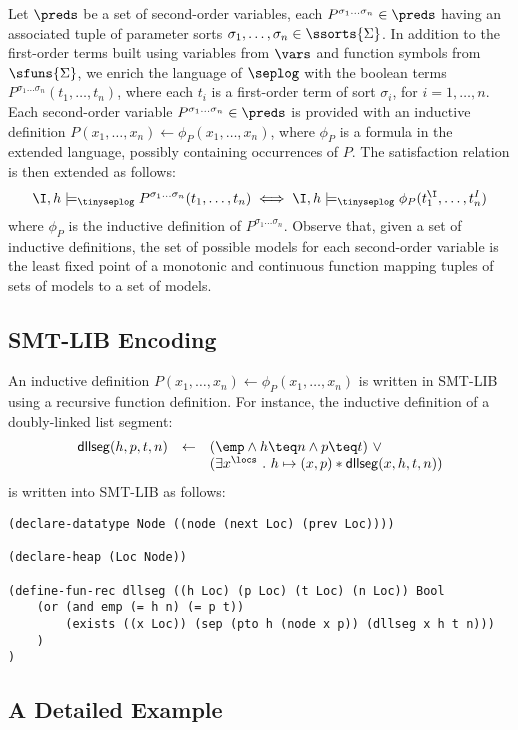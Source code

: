 \documentclass[10pt]{llncs}
\begin{document}
Let $\preds$ be a set of second-order variables, each $P^{\sigma_1
  \ldots \sigma_n} \in \preds$ having an associated tuple of parameter
sorts $\sigma_1, \ldots, \sigma_n \in \ssorts{\Sigma}$. In addition to
the first-order terms built using variables from $\vars$ and function
symbols from $\sfuns{\Sigma}$, we enrich the language of $\seplog$
with the boolean terms $P^{\sigma_1 \ldots \sigma_n}(t_1, \ldots,
t_n)$, where each $t_i$ is a first-order term of sort $\sigma_i$, for
$i=1,\ldots,n$. Each second-order variable $P^{\sigma_1 \ldots
  \sigma_n} \in \preds$ is provided with an inductive definition
$P(x_1,\ldots,x_n) \leftarrow \phi_P(x_1,\ldots,x_n)$, where $\phi_P$
is a formula in the extended language, possibly containing occurrences
of $P$. The satisfaction relation is then extended as follows:
\[\I,h \models_{\tinyseplog} P^{\sigma_1 \ldots \sigma_n}(t_1,\ldots,t_n) \iff 
\I,h \models_{\tinyseplog} \phi_P(t^\I_1,\ldots,t^I_n)\] where
$\phi_P$ is the inductive definition of $P^{\sigma_1 \ldots
  \sigma_n}$. Observe that, given a set of inductive definitions, the
set of possible models for each second-order variable is the least
fixed point of a monotonic and continuous function mapping tuples of
sets of models to a set of models.

\subsection{SMT-LIB Encoding}

An inductive definition $P(x_1,\ldots,x_n) \leftarrow
\phi_P(x_1,\ldots,x_n)$ is written in SMT-LIB using a recursive
function definition. For instance, the inductive definition of a 
doubly-linked list segment:
\[\begin{array}{rcl}
\mathsf{dllseg}(h, p, t, n) & \leftarrow & (\emp \wedge h \teq n \wedge p \teq t) ~\vee \\
&& (\exists x^{\locs} ~.~ h \mapsto (x,p) * \mathsf{dllseg}(x,h,t,n))
\end{array}\]
is written into SMT-LIB as follows: 
\begin{Verbatim}
(declare-datatype Node ((node (next Loc) (prev Loc))))

(declare-heap (Loc Node))

(define-fun-rec dllseg ((h Loc) (p Loc) (t Loc) (n Loc)) Bool
    (or (and emp (= h n) (= p t))
        (exists ((x Loc)) (sep (pto h (node x p)) (dllseg x h t n)))
    )
)
\end{Verbatim}

\subsection{A Detailed Example} 
\end{document}
